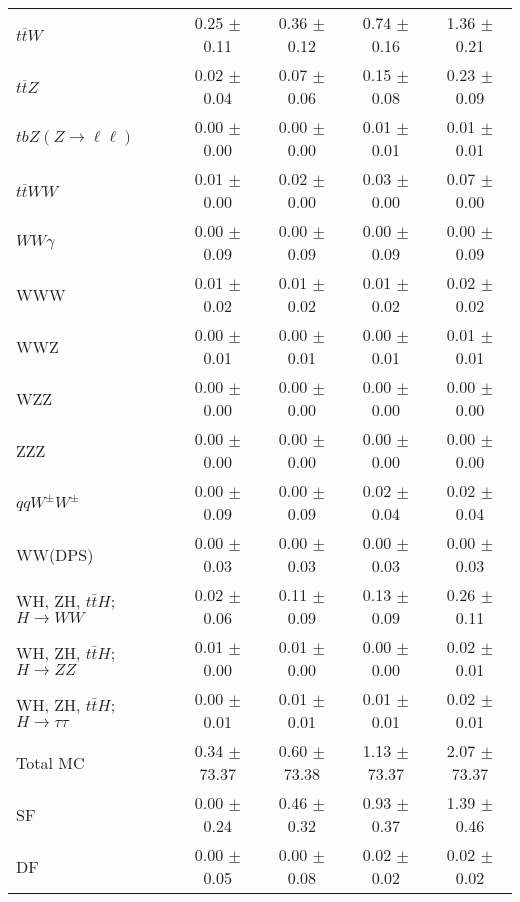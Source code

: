 \begin{tabular}{l|cccc}
                   $t\overline{t}W$ &  0.25 $\pm$  0.11 &  0.36 $\pm$  0.12 &  0.74 $\pm$  0.16 &  1.36 $\pm$  0.21 \\
                   $t\overline{t}Z$ &  0.02 $\pm$  0.04 &  0.07 $\pm$  0.06 &  0.15 $\pm$  0.08 &  0.23 $\pm$  0.09 \\
    $tbZ (Z \rightarrow \ell \ell)$ &  0.00 $\pm$  0.00 &  0.00 $\pm$  0.00 &  0.01 $\pm$  0.01 &  0.01 $\pm$  0.01 \\
                  $t\overline{t}WW$ &  0.01 $\pm$  0.00 &  0.02 $\pm$  0.00 &  0.03 $\pm$  0.00 &  0.07 $\pm$  0.00 \\
                         $WW\gamma$ &  0.00 $\pm$  0.09 &  0.00 $\pm$  0.09 &  0.00 $\pm$  0.09 &  0.00 $\pm$  0.09 \\
                                WWW &  0.01 $\pm$  0.02 &  0.01 $\pm$  0.02 &  0.01 $\pm$  0.02 &  0.02 $\pm$  0.02 \\
                                WWZ &  0.00 $\pm$  0.01 &  0.00 $\pm$  0.01 &  0.00 $\pm$  0.01 &  0.01 $\pm$  0.01 \\
                                WZZ &  0.00 $\pm$  0.00 &  0.00 $\pm$  0.00 &  0.00 $\pm$  0.00 &  0.00 $\pm$  0.00 \\
                                ZZZ &  0.00 $\pm$  0.00 &  0.00 $\pm$  0.00 &  0.00 $\pm$  0.00 &  0.00 $\pm$  0.00 \\
                 $qqW^{\pm}W^{\pm}$ &  0.00 $\pm$  0.09 &  0.00 $\pm$  0.09 &  0.02 $\pm$  0.04 &  0.02 $\pm$  0.04 \\
                            WW(DPS) &  0.00 $\pm$  0.03 &  0.00 $\pm$  0.03 &  0.00 $\pm$  0.03 &  0.00 $\pm$  0.03 \\
WH, ZH, $t\bar{t}H$; $H \rightarrow WW$ &  0.02 $\pm$  0.06 &  0.11 $\pm$  0.09 &  0.13 $\pm$  0.09 &  0.26 $\pm$  0.11 \\
WH, ZH, $t\bar{t}H$; $H \rightarrow ZZ$ &  0.01 $\pm$  0.00 &  0.01 $\pm$  0.00 &  0.00 $\pm$  0.00 &  0.02 $\pm$  0.01 \\
WH, ZH, $t\bar{t}H$; $H \rightarrow \tau\tau$ &  0.00 $\pm$  0.01 &  0.01 $\pm$  0.01 &  0.01 $\pm$  0.01 &  0.02 $\pm$  0.01 \\
\hline\hline
                           Total MC &  0.34 $\pm$ 73.37 &  0.60 $\pm$ 73.38 &  1.13 $\pm$ 73.37 &  2.07 $\pm$ 73.37 \\
\hline
                                 SF &  0.00 $\pm$  0.24 &  0.46 $\pm$  0.32 &  0.93 $\pm$  0.37 &  1.39 $\pm$  0.46 \\
                                 DF &  0.00 $\pm$  0.05 &  0.00 $\pm$  0.08 &  0.02 $\pm$  0.02 &  0.02 $\pm$  0.02 \\

\end{tabular}
